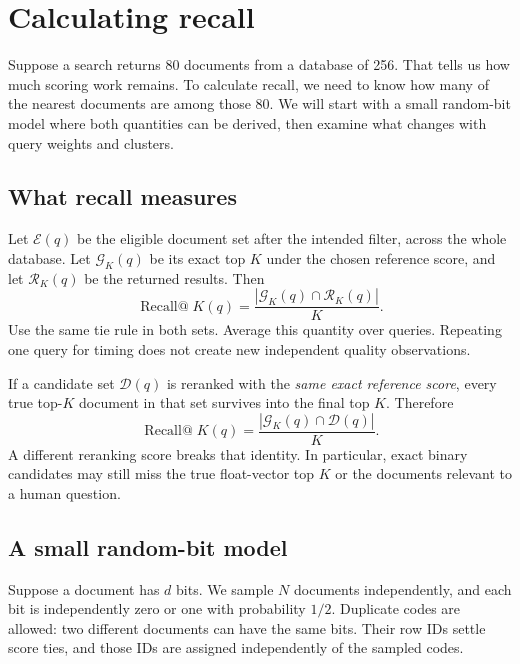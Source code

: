 \section{Calculating recall}
\label{sec:recall}
Suppose a search returns 80 documents from a database of 256. That tells us how much scoring
work remains. To calculate recall, we need to know how many of the nearest documents are among
those 80. We will start with a small random-bit model where both quantities can be derived,
then examine what changes with query weights and clusters.

\subsection{What recall measures}
Let $\mathcal E(q)$ be the eligible document set after the intended filter, across the whole
database. Let $\mathcal G_K(q)$ be its exact top $K$ under the chosen reference score, and let
$\mathcal R_K(q)$ be the returned results. Then
\begin{equation}
\operatorname{Recall@}K(q)=
\frac{|\mathcal G_K(q)\cap\mathcal R_K(q)|}{K}.
\label{eq:recall-exact}
\end{equation}
Use the same tie rule in both sets. Average this quantity over queries. Repeating one query
for timing does not create new independent quality observations.

If a candidate set $\mathcal D(q)$ is reranked with the \emph{same exact reference score}, every
true top-$K$ document in that set survives into the final top $K$. Therefore
\begin{equation}
\operatorname{Recall@}K(q)=\frac{|\mathcal G_K(q)\cap\mathcal D(q)|}{K}.
\label{eq:candidate-recall}
\end{equation}
A different reranking score breaks that identity. In particular, exact binary candidates may
still miss the true float-vector top $K$ or the documents relevant to a human question.


\subsection{A small random-bit model}
Suppose a document has $d$ bits. We sample $N$ documents independently, and each bit is
independently zero or one with probability $1/2$. Duplicate codes are allowed: two different
documents can have the same bits. Their row IDs settle score ties, and those IDs are assigned
independently of the sampled codes.

